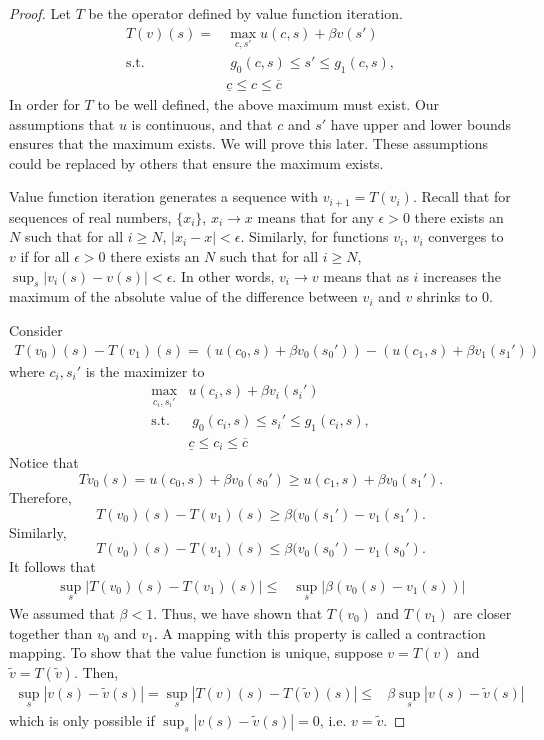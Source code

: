 \begin{proof}
  Let $T$ be the operator defined by value function iteration. 
  \begin{align*}
    T(v)(s) = & \max_{c,s'} u(c,s) + \beta v(s') \\
    \text{s.t.} & \; g_0(c,s) \leq s' \leq g_1(c,s), \\
    & \underline{c} \leq c \leq \overline{c}
  \end{align*}
  In order for $T$ to be well defined, the above maximum must exist. 
  Our assumptions that $u$ is continuous, and that $c$ and $s'$ have
  upper and lower bounds ensures that the maximum exists. We will
  prove this later. These assumptions could be replaced by others that
  ensure the maximum exists. 
  
  Value function iteration generates a sequence with $v_{i+1} =
  T(v_i)$.  Recall that for sequences of real numbers, $\{x_i\}$, $x_i
  \to x$ means that for any $\epsilon >0$ there exists an $N$ such
  that for all $i \geq N$, $|x_i - x| < \epsilon$. Similarly, for
  functions $v_i$, $v_i$ converges to $v$ if for all $\epsilon>0$
  there exists an $N$ such that for all $i \geq N$, $\sup_{s} |v_i(s)
  - v(s)| < \epsilon$. In other words, $v_i \to v$ means that as $i$
  increases the maximum of the absolute value of the difference
  between $v_i$ and $v$ shrinks to $0$. 
  
  Consider
  \begin{align*}
    T(v_0)(s)-T(v_1)(s) =  \left(u(c_0,s) + \beta v_0(s_0')  \right) -
    \left(u(c_1,s) + \beta v_1(s_1')  \right)
  \end{align*} 
  where $c_i,s_i'$ is the maximizer to 
  \begin{align*}
    \max_{c_i,s_i'} & u(c_i,s) + \beta v_i(s_i') \\
    \text{s.t.} & \; g_0(c_i,s) \leq s_i' \leq g_1(c_i,s), \\
                & \underline{c} \leq c_i \leq \overline{c}
  \end{align*}
  Notice that
  \[ T v_0 (s) = u(c_0,s) + \beta v_0(s_0')  \geq u(c_1,s) + \beta
  v_0(s_1'). \]
  Therefore,
  \[ T(v_0)(s) - T(v_1)(s) \geq \beta (v_0(s_1') - v_1(s_1'). \]
  Similarly,
  \[ T(v_0)(s)-T(v_1)(s) \leq \beta (v_0(s_0') - v_1(s_0'). \]
  It follows that
  \begin{align*}
    \sup_{s}
    \left\vert T(v_0)(s)-T(v_1)(s) \right\vert 
    \leq & \sup_s \left\vert \beta(v_0(s) -v_1(s)) \right\vert 
  \end{align*}
  We assumed that $\beta < 1$. Thus, we have shown that $T(v_0)$ and
  $T(v_1)$ are closer together than $v_0$ and $v_1$. A mapping with
  this property is called a contraction mapping. To show that the
  value function is unique, suppose $v = T(v)$ and $\tilde{v} =
  T(\tilde{v})$. Then, 
  \begin{align*}
    \sup_s \left\vert v(s) -\tilde{v}(s) \right\vert = \sup_{s}
    \left\vert T(v)(s)-T(\tilde{v})(s) \right\vert \leq & \beta \sup_s
    \left\vert v(s) -\tilde{v}(s) \right\vert
  \end{align*}
  which is only possible if $\sup_s \left\vert v(s) -\tilde{v}(s)
  \right\vert = 0$, i.e. $v = \tilde{v}$.
 

\end{proof}
